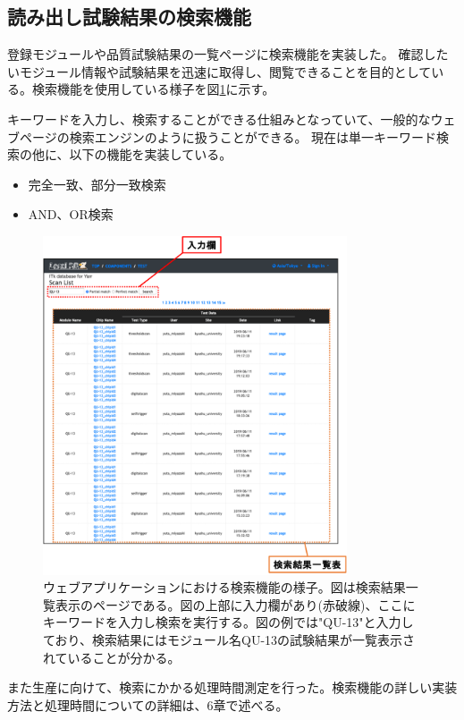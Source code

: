 \subsection{読み出し試験結果の検索機能}
登録モジュールや品質試験結果の一覧ページに検索機能を実装した。
確認したいモジュール情報や試験結果を迅速に取得し、閲覧できることを目的としている。検索機能を使用している様子を図\ref{webapp_search_function}に示す。

キーワードを入力し、検索することができる仕組みとなっていて、一般的なウェブページの検索エンジンのように扱うことができる。
現在は単一キーワード検索の他に、以下の機能を実装している。
\begin{itemize}
  \item 完全一致、部分一致検索
  \item AND、OR検索
\end{itemize}

\begin{figure}[bpt]\centering
\includegraphics[width=9cm]{webapp_search_function}
\caption[ウェブアプリケーションにおける検索機能の様子]{ウェブアプリケーションにおける検索機能の様子。図は検索結果一覧表示のページである。図の上部に入力欄があり(赤破線)、ここにキーワードを入力し検索を実行する。図の例では"QU-13"と入力しており、検索結果にはモジュール名QU-13の試験結果が一覧表示されていることが分かる。}
\label{webapp_search_function}
\end{figure}

また生産に向けて、検索にかかる処理時間測定を行った。検索機能の詳しい実装方法と処理時間についての詳細は、6章で述べる。

\clearpage
